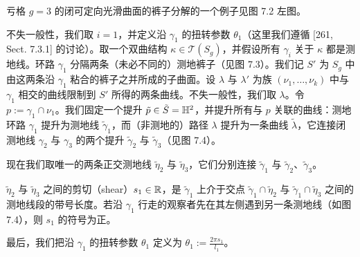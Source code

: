 

亏格 $g=3$ 的闭可定向光滑曲面的裤子分解的一个例子见图 7.2 左图。


不失一般性，我们取 $i=1$，并定义沿 $\gamma_1$ 的扭转参数 $\theta_1$（这里我们遵循 [261, Sect. 7.3.1] 的讨论）。取一个双曲结构 $\kappa\in\mathcal{T}(S_g)$，并假设所有 $\gamma_i$ 关于 $\kappa$ 都是测地线。环路 $\gamma_1$ 分隔两条（未必不同的）测地裤子（见图 7.3）。我们记 $S'$ 为 $S_g$ 中由这两条沿 $\gamma_1$ 粘合的裤子之并所成的子曲面。设 $\lambda$ 与 $\lambda'$ 为族 $(\nu_1,\dots,\nu_k)$ 中与 $\gamma_1$ 相交的曲线限制到 $S'$ 所得的两条曲线。不失一般性，我们取 $\lambda$。令 $p:=\gamma_1\cap\nu_1$。我们固定一个提升 $\tilde p\in\tilde S=\mathbb{H}^2$，并提升所有与 $p$ 关联的曲线：测地环路 $\gamma_1$ 提升为测地线 $\tilde\gamma_1$，而（非测地的）路径 $\lambda$ 提升为一条曲线 $\tilde\lambda$，它连接闭测地线 $\gamma_2$ 与 $\gamma_3$ 的两个提升 $\tilde\gamma_2$ 与 $\tilde\gamma_3$（见图 7.4）。



现在我们取唯一的两条正交测地线 $\tilde\eta_2$ 与 $\tilde\eta_3$，它们分别连接 $\tilde\gamma_1$ 与 $\tilde\gamma_2$、$\tilde\gamma_3$。

\begin{definition}[7.1] $\tilde\eta_2$ 与 $\tilde\eta_3$ 之间的剪切（shear）$s_1\in\mathbb{R}$，是 $\tilde\gamma_1$ 上介于交点 $\tilde\gamma_1\cap\tilde\eta_2$ 与 $\tilde\gamma_1\cap\tilde\eta_3$ 之间的测地线段的带号长度。若沿 $\gamma_1$ 行走的观察者先在其左侧遇到另一条测地线（如图 7.4），则 $s_1$ 的符号为正。\end{definition}

最后，我们把沿 $\gamma_1$ 的扭转参数 $\theta_1$ 定义为 $\theta_1:=\frac{2\pi s_1}{l_1}$。


